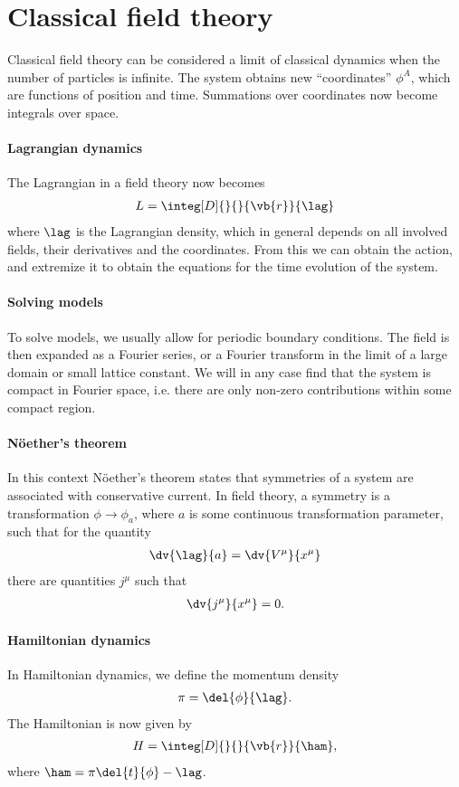 \section{Classical field theory}

Classical field theory can be considered a limit of classical dynamics when the number of particles is infinite. The system obtains new ``coordinates'' $\phi^{A}$, which are functions of position and time. Summations over coordinates now become integrals over space.

\paragraph{Lagrangian dynamics}
The Lagrangian in a field theory now becomes
\begin{align*}
	L = \integ[D]{}{}{\vb{r}}{\lag}
\end{align*}
where $\lag$ is the Lagrangian density, which in general depends on all involved fields, their derivatives and the coordinates. From this we can obtain the action, and extremize it to obtain the equations for the time evolution of the system.

\paragraph{Solving models}
To solve models, we usually allow for periodic boundary conditions. The field is then expanded as a Fourier series, or a Fourier transform in the limit of a large domain or small lattice constant. We will in any case find that the system is compact in Fourier space, i.e. there are only non-zero contributions within some compact region.

\paragraph{Nöether's theorem}
In this context Nöether's theorem states that symmetries of a system are associated with conservative current. In field theory, a symmetry is a transformation $\phi\to\phi_{a}$, where $a$ is some continuous transformation parameter, such that for the quantity
\begin{align*}
	\dv{\lag}{a} = \dv{V^{\mu}}{x^{\mu}}
\end{align*}
there are quantities $j^{\mu}$ such that
\begin{align*}
	\dv{j^{\mu}}{x^{\mu}} = 0.
\end{align*}

\paragraph{Hamiltonian dynamics}
In Hamiltonian dynamics, we define the momentum density
\begin{align*}
	\pi = \del{\phi}{\lag}.
\end{align*}
The Hamiltonian is now given by
\begin{align*}
	H = \integ[D]{}{}{\vb{r}}{\ham},
\end{align*}
where $\ham = \pi\del{t}{\phi} - \lag$.

